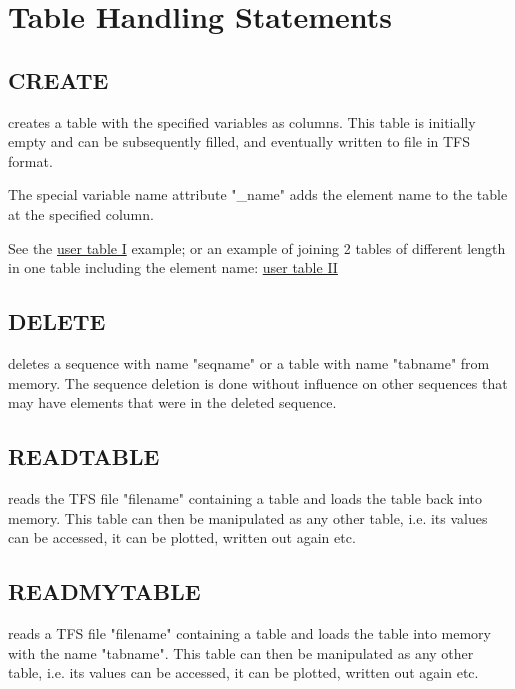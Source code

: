 \chapter{Table Handling Statements} 
\label{chap:tables}

\section{CREATE}
\label{sec:create}
creates a table with the specified variables as columns. 
This table is initially empty and can be subsequently filled, and
eventually written to file in TFS format.  

The special variable name attribute "\_name" adds
the element name to the table at the specified column.


See the \href{../Introduction/select.html#ucreate}{user table I}
example; 
or an example of joining 2 tables of different length in one table
including the element name:
\href{../Introduction/select.html#screate}{user table II} 

\section{DELETE}
\label{sec:delete}
deletes a sequence with name "seqname" or a table with name "tabname"
from memory. The sequence deletion is done without influence on other
sequences that may have elements that were in the deleted sequence.   

\section{READTABLE}
\label{sec:readtable}
reads the TFS file "filename" containing a \mad table and loads the
table back into memory. This table can then be manipulated as any other
table, i.e. its values can be accessed, it can be plotted, written out
again etc.

\section{READMYTABLE}
\label{sec:readmytable}
reads a TFS file "filename" containing a \mad table and loads the table
into memory with the name "tabname". This table
can then be manipulated as any other table, i.e. its values can be
accessed, it can be plotted, written out again etc. 

